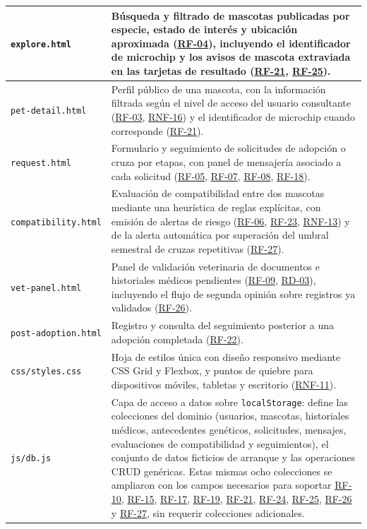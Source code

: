 \documentclass[journal,onecolumn]{IEEEtran}
\begin{document}
\begin{longtable}{@{}p{4.2cm} p{10.6cm}@{}}
		\hline
		\texttt{explore.html} & Búsqueda y filtrado de mascotas publicadas por especie, estado de interés y ubicación aproximada (\hyperref[tab:RF-04]{RF-04}), incluyendo el identificador de microchip y los avisos de mascota extraviada en las tarjetas de resultado (\hyperref[tab:RF-21]{RF-21}, \hyperref[tab:RF-25]{RF-25}). \\
		\hline
		\texttt{pet-detail.html} & Perfil público de una mascota, con la información filtrada según el nivel de acceso del usuario consultante (\hyperref[tab:RF-03]{RF-03}, \hyperref[tab:RNF-16]{RNF-16}) y el identificador de microchip cuando corresponde (\hyperref[tab:RF-21]{RF-21}). \\
		\hline
		\texttt{request.html} & Formulario y seguimiento de solicitudes de adopción o cruza por etapas, con panel de mensajería asociado a cada solicitud (\hyperref[tab:RF-05]{RF-05}, \hyperref[tab:RF-07]{RF-07}, \hyperref[tab:RF-08]{RF-08}, \hyperref[tab:RF-18]{RF-18}). \\
		\hline
		\texttt{compatibility.html} & Evaluación de compatibilidad entre dos mascotas mediante una heurística de reglas explícitas, con emisión de alertas de riesgo (\hyperref[tab:RF-06]{RF-06}, \hyperref[tab:RF-23]{RF-23}, \hyperref[tab:RNF-13]{RNF-13}) y de la alerta automática por superación del umbral semestral de cruzas repetitivas (\hyperref[tab:RF-27]{RF-27}). \\
		\hline
		\texttt{vet-panel.html} & Panel de validación veterinaria de documentos e historiales médicos pendientes (\hyperref[tab:RF-09]{RF-09}, \hyperref[tab:RD-03]{RD-03}), incluyendo el flujo de segunda opinión sobre registros ya validados (\hyperref[tab:RF-26]{RF-26}). \\
		\hline
		\texttt{post-adoption.html} & Registro y consulta del seguimiento posterior a una adopción completada (\hyperref[tab:RF-22]{RF-22}). \\
		\hline
		\texttt{css/styles.css} & Hoja de estilos única con diseño responsivo mediante CSS Grid y Flexbox, y puntos de quiebre para dispositivos móviles, tabletas y escritorio (\hyperref[tab:RNF-11]{RNF-11}). \\
		\hline
		\texttt{js/db.js} & Capa de acceso a datos sobre \texttt{localStorage}: define las colecciones del dominio (usuarios, mascotas, historiales médicos, antecedentes genéticos, solicitudes, mensajes, evaluaciones de compatibilidad y seguimientos), el conjunto de datos ficticios de arranque y las operaciones CRUD genéricas. Estas mismas ocho colecciones se ampliaron con los campos necesarios para soportar \hyperref[tab:RF-10]{RF-10}, \hyperref[tab:RF-15]{RF-15}, \hyperref[tab:RF-17]{RF-17}, \hyperref[tab:RF-19]{RF-19}, \hyperref[tab:RF-21]{RF-21}, \hyperref[tab:RF-24]{RF-24}, \hyperref[tab:RF-25]{RF-25}, \hyperref[tab:RF-26]{RF-26} y \hyperref[tab:RF-27]{RF-27}, sin requerir colecciones adicionales. \\

\end{longtable}
\end{document}
